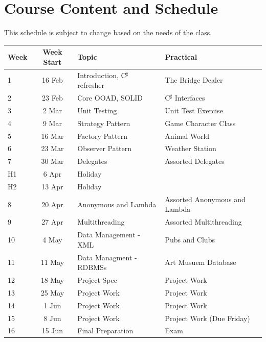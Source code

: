 \documentclass{article}
\newcommand{\Csh}{C$^\sharp$}
\begin{document}
\section*{Course Content and Schedule}
This schedule is subject to change based on the needs of the class.

\renewcommand{\arraystretch}{1.5}
\begin{tabular}{|l|c|l|l|}
\hline
 Week & Week Start & Topic                   & Practical      \\ \hline
1    & 16 Feb     & Introduction, \Csh{} refresher & The Bridge Dealer\\ \hline
2    & 23 Feb     & Core OOAD, SOLID & \Csh{} Interfaces \\ \hline
 3    &  2 Mar     & Unit Testing  & Unit Test Exercise \\ \hline
 4    &  9 Mar     & Strategy Pattern & Game Character Class   \\ \hline
 5    & 16 Mar     & Factory Pattern & Animal World  \\ \hline
 6    & 23 Mar     & Observer Pattern & Weather Station    \\ \hline
 7    & 30 Mar     & Delegates  & Assorted Delegates \\ \hline
 H1   &  6 Apr     & Holiday            & \\ \hline
 H2   & 13 Apr     & Holiday            & \\ \hline
 8    & 20 Apr     & Anonymous and Lambda  & Assorted Anonymous and Lambda \\ \hline
 9    & 27 Apr     & Multithreading  & Assorted Multithreading         \\ \hline
 10   &  4 May     & Data Management - XML & Pubs and Clubs \\ \hline
 11   & 11 May     & Data Managment - RDBMSs &  Art Musuem Database \\ \hline
 12   & 18 May     & Project Spec &  Project Work \\ \hline
 13   & 25 May     & Project Work & Project Work  \\ \hline
 14   &  1 Jun     & Project Work & Project Work  \\ \hline
15   &  8 Jun     & Project Work & Project Work (Due Friday)  \\ \hline
 16   & 15 Jun     & Final Preparation & Exam \\ \hline
\end{tabular}

\newpage
\end{document}
